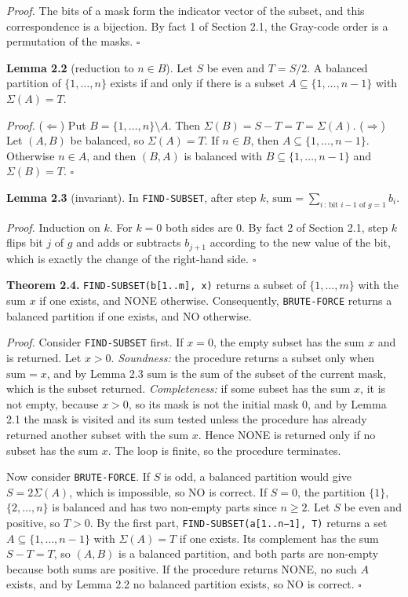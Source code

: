 \documentclass[
]{article}
\begin{document}
\emph{Proof.} The bits of a mask form the indicator vector of the
subset, and this correspondence is a bijection. By fact 1 of Section
2.1, the Gray-code order is a permutation of the masks. \(\square\)

\textbf{Lemma 2.2} (reduction to \(n \in B\)). Let \(S\) be even and
\(T = S/2\). A balanced partition of \(\{1, \dots, n\}\) exists if and
only if there is a subset \(A \subseteq \{1, \dots, n-1\}\) with
\(\Sigma(A) = T\).

\emph{Proof.} (\(\Leftarrow\)) Put \(B = \{1, \dots, n\} \setminus A\).
Then \(\Sigma(B) = S - T = T = \Sigma(A)\). (\(\Rightarrow\)) Let
\((A, B)\) be balanced, so \(\Sigma(A) = T\). If \(n \in B\), then
\(A \subseteq \{1, \dots, n-1\}\). Otherwise \(n \in A\), and then
\((B, A)\) is balanced with \(B \subseteq \{1, \dots, n-1\}\) and
\(\Sigma(B) = T\). \(\square\)

\textbf{Lemma 2.3} (invariant). In \texttt{FIND-SUBSET}, after step
\(k\),
\(\mathrm{sum} = \sum_{i \,:\, \text{bit } i-1 \text{ of } g = 1} b_i\).

\emph{Proof.} Induction on \(k\). For \(k = 0\) both sides are \(0\). By
fact 2 of Section 2.1, step \(k\) flips bit \(j\) of \(g\) and adds or
subtracts \(b_{j+1}\) according to the new value of the bit, which is
exactly the change of the right-hand side. \(\square\)

\textbf{Theorem 2.4.} \texttt{FIND-SUBSET(b{[}1..m{]},\ x)} returns a
subset of \(\{1, \dots, m\}\) with the sum \(x\) if one exists, and NONE
otherwise. Consequently, \texttt{BRUTE-FORCE} returns a balanced
partition if one exists, and NO otherwise.

\emph{Proof.} Consider \texttt{FIND-SUBSET} first. If \(x = 0\), the
empty subset has the sum \(x\) and is returned. Let \(x > 0\).
\emph{Soundness:} the procedure returns a subset only when
\(\mathrm{sum} = x\), and by Lemma 2.3 \(\mathrm{sum}\) is the sum of
the subset of the current mask, which is the subset returned.
\emph{Completeness:} if some subset has the sum \(x\), it is not empty,
because \(x > 0\), so its mask is not the initial mask \(0\), and by
Lemma 2.1 the mask is visited and its sum tested unless the procedure
has already returned another subset with the sum \(x\). Hence NONE is
returned only if no subset has the sum \(x\). The loop is finite, so the
procedure terminates.

Now consider \texttt{BRUTE-FORCE}. If \(S\) is odd, a balanced partition
would give \(S = 2\Sigma(A)\), which is impossible, so NO is correct. If
\(S = 0\), the partition \(\{1\}\), \(\{2, \dots, n\}\) is balanced and
has two non-empty parts since \(n \ge 2\). Let \(S\) be even and
positive, so \(T > 0\). By the first part,
\texttt{FIND-SUBSET(a{[}1..n−1{]},\ T)} returns a set
\(A \subseteq \{1, \dots, n-1\}\) with \(\Sigma(A) = T\) if one exists.
Its complement has the sum \(S - T = T\), so \((A, B)\) is a balanced
partition, and both parts are non-empty because both sums are positive.
If the procedure returns NONE, no such \(A\) exists, and by Lemma 2.2 no
balanced partition exists, so NO is correct. \(\square\)
\end{document}
